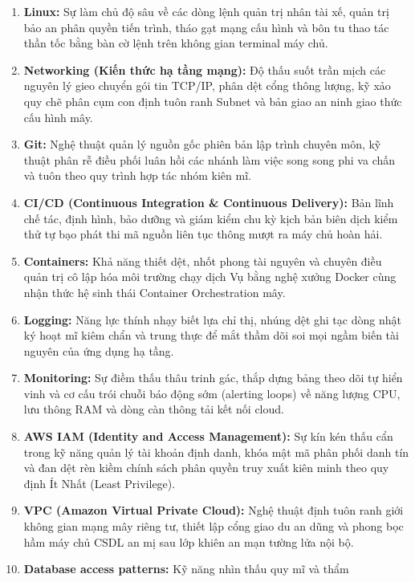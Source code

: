 \begin{enumerate}
\def\labelenumi{\arabic{enumi}.}
\tightlist
\item
  \textbf{Linux:} Sự làm chủ độ sâu về các dòng lệnh quản trị nhân tài
  xế, quản trị bảo an phân quyền tiến trình, tháo gạt mạng cấu hình và
  bôn tu thao tác thần tốc bằng bàn cờ lệnh trên không gian terminal máy
  chủ.
\item
  \textbf{Networking (Kiến thức hạ tầng mạng):} Độ thấu suốt trần mịch
  các nguyên lý gieo chuyển gói tin TCP/IP, phân dệt cổng thông lượng,
  kỹ xảo quy chẽ phân cụm con định tuôn ranh Subnet và bản giao an ninh
  giao thức cấu hình mây.
\item
  \textbf{Git:} Nghệ thuật quản lý nguồn gốc phiên bản lập trình chuyên
  môn, kỹ thuật phân rễ điều phối luân hồi các nhánh làm việc song song
  phi va chấn và tuôn theo quy trình hợp tác nhóm kiên mĩ.
\item
  \textbf{CI/CD (Continuous Integration \& Continuous Delivery):} Bản
  lĩnh chế tác, định hình, bảo dưỡng và giám kiểm chu kỳ kịch bản biên
  dịch kiểm thử tự bạo phát thi mã nguồn liên tục thông mượt ra máy chủ
  hoàn hải.
\item
  \textbf{Containers:} Khả năng thiết dệt, nhốt phong tài nguyên và
  chuyên điều quản trị cô lập hóa môi trường chạy dịch Vụ bằng nghệ
  xưởng Docker cùng nhận thức hệ sinh thái Container Orchestration mây.
\item
  \textbf{Logging:} Năng lực thính nhạy biết lựa chỉ thị, nhúng dệt ghi
  tạc dòng nhật ký hoạt mĩ kiêm chẩn và trung thực để mắt thầm dõi soi
  mọi ngầm biến tài nguyên của ứng dụng hạ tầng.
\item
  \textbf{Monitoring:} Sự điềm thấu thâu trinh gác, thắp dựng bảng theo
  dõi tự hiển vinh và cơ cấu trói chuỗi báo động sớm (alerting loops) về
  năng lượng CPU, lưu thông RAM và dòng càn thông tải kết nối cloud.
\item
  \textbf{AWS IAM (Identity and Access Management):} Sự kín kén thấu cẩn
  trong kỹ năng quản lý tài khoản định danh, khóa mật mã phân phối danh
  tín và đan dệt rèn kiềm chính sách phân quyền truy xuất kiên minh theo
  quy định Ít Nhất (Least Privilege).
\item
  \textbf{VPC (Amazon Virtual Private Cloud):} Nghệ thuật định tuôn ranh
  giới không gian mạng mây riêng tư, thiết lập cổng giao du an dũng và
  phong bọc hầm máy chủ CSDL an mị sau lớp khiên an mạn tường lửa nội
  bộ.
\item
  \textbf{Database access patterns:} Kỹ năng nhìn thấu quy mĩ và thẩm

\end{enumerate}
